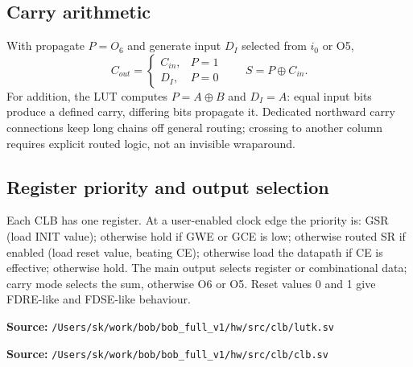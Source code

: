 \documentclass[11pt,a4paper]{article}
\newcommand{\src}[1]{\par\smallskip\noindent\textbf{Source: }\nolinkurl{/Users/sk/work/bob/bob_full_v1/#1}\par\smallskip}
\begin{document}
\subsection{Carry arithmetic}
With propagate $P=O_6$ and generate input $D_I$ selected from $i_0$ or O5,
\[ C_{out}=\begin{cases} C_{in}, & P=1\\ D_I, & P=0\end{cases}
   \qquad S=P\oplus C_{in}. \]
For addition, the LUT computes $P=A\oplus B$ and $D_I=A$: equal input bits
produce a defined carry, differing bits propagate it. Dedicated northward carry
connections keep long chains off general routing; crossing to another column
requires explicit routed logic, not an invisible wraparound.

\subsection{Register priority and output selection}
Each CLB has one register. At a user-enabled clock edge the priority is:
GSR (load INIT value); otherwise hold if GWE or GCE is low; otherwise routed SR
if enabled (load reset value, beating CE); otherwise load the datapath if CE is
effective; otherwise hold. The main output selects register or combinational
data; carry mode selects the sum, otherwise O6 or O5. Reset values 0 and 1 give
FDRE-like and FDSE-like behaviour.
\src{hw/src/clb/lutk.sv}
\src{hw/src/clb/clb.sv}
\end{document}
